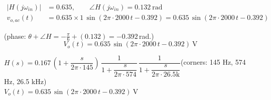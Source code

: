 \documentclass[11pt]{article}
\begin{document}
\begin{align*}
|H(j\omega_{in})| &= 0.635, \qquad \angle H(j\omega_{in}) = 0.132\ \mathrm{rad} \\
v_{o,ac}(t) &= 0.635\times 1\,\sin\left(2\pi\cdot 2000\,t - 0.392\right) = 0.635\,\sin\left(2\pi\cdot 2000\,t - 0.392\right)
\end{align*}

(phase: $\theta + \angle H = -\frac{\pi}{6} + (0.132) = -0.392$\,rad.)
\[
\boxed{V_o(t) = 0.635\,\sin\left(2\pi\cdot 2000\,t - 0.392\right)\ \mathrm{V}}
\]

\begin{ansbox}
$H(s) = 0.167\,\left(1+\dfrac{s}{2\pi\cdot 145}\right)\,\dfrac{1}{1+\dfrac{s}{2\pi\cdot 574}}\,\dfrac{1}{1+\dfrac{s}{2\pi\cdot 26.5\mathrm{k}}}$\quad (corners: 145 Hz, 574 Hz, 26.5 kHz)\\[4pt]
$V_o(t) = 0.635\,\sin\left(2\pi\cdot 2000\,t - 0.392\right)\ \mathrm{V}$
\end{ansbox}
\end{document}
